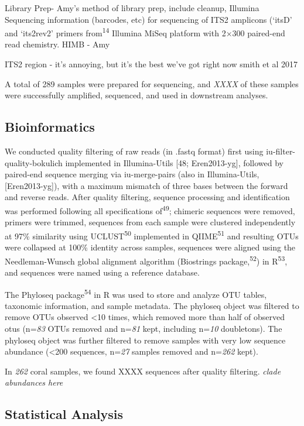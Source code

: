 \documentclass[]{article}
\begin{document}
Library Prep- Amy's method of library prep, include cleanup, Illumina
Sequencing information (barcodes, etc) for sequencing of ITS2 amplicons
(`itsD' and `its2rev2' primers from\textsuperscript{14} Illumina MiSeq
platform with 2×300 paired-end read chemistry. HIMB - Amy

ITS2 region - it's annoying, but it's the best we've got right now smith
et al 2017

A total of 289 samples were prepared for sequencing, and \emph{XXXX} of
these samples were successfully amplified, sequenced, and used in
downstream analyses.

\subsection{Bioinformatics}\label{bioinformatics}

We conducted quality filtering of raw reads (in .fastq format) first
using iu-filter-quality-bokulich implemented in Illumina-Utils {[}48;
Eren2013-yg{]}, followed by paired-end sequence merging via
iu-merge-pairs (also in Illumina-Utils, {[}Eren2013-yg{]}), with a
maximum mismatch of three bases between the forward and reverse reads.
After quality filtering, sequence processing and identification was
performed following all specifications of\textsuperscript{49}; chimeric
sequences were removed, primers were trimmed, sequences from each sample
were clustered independently at 97\% similarity using
UCLUST\textsuperscript{50} implemented in QIIME\textsuperscript{51} and
resulting OTUs were collapsed at 100\% identity across samples,
sequences were aligned using the Needleman-Wunsch global alignment
algorithm (Biostrings package,\textsuperscript{52}) in
R\textsuperscript{53}, and sequences were named using a reference
database.

The Phyloseq package\textsuperscript{54} in R was used to store and
analyze OTU tables, taxonomic information, and sample metadata. The
phyloseq object was filtered to remove OTUs observed \textless{}10
times, which removed more than half of observed otus (n=\emph{83} OTUs
removed and n=\emph{81} kept, including n=\emph{10} doubletons). The
phyloseq object was further filtered to remove samples with very low
sequence abundance (\textless{}200 sequences, n=\emph{27} samples
removed and n=\emph{262} kept).

In \emph{262} coral samples, we found XXXX sequences after quality
filtering. \emph{clade abundances here}

\subsection{Statistical Analysis}\label{statistical-analysis}
\end{document}
